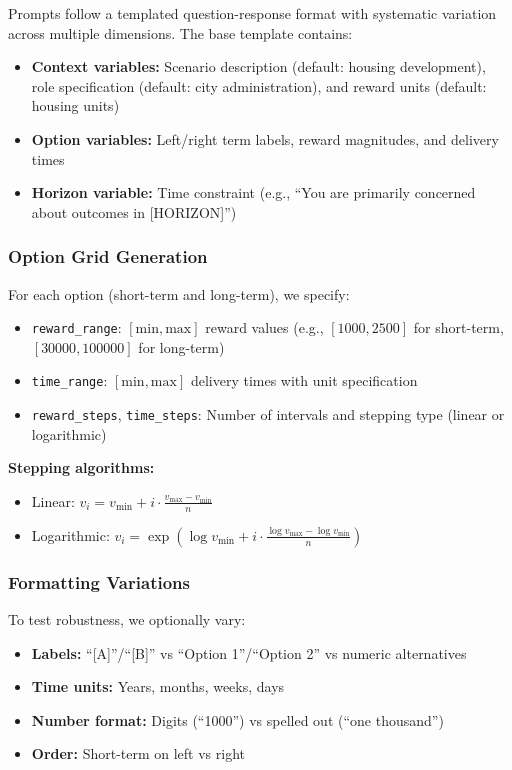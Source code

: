 \documentclass{article}
\begin{document}
Prompts follow a templated question-response format with systematic variation across multiple dimensions. The base template contains:

\begin{itemize}
    \item \textbf{Context variables:} Scenario description (default: housing development), role specification (default: city administration), and reward units (default: housing units)
    \item \textbf{Option variables:} Left/right term labels, reward magnitudes, and delivery times
    \item \textbf{Horizon variable:} Time constraint (e.g., ``You are primarily concerned about outcomes in [HORIZON]'')
\end{itemize}

\subsubsection{Option Grid Generation}

For each option (short-term and long-term), we specify:
\begin{itemize}
    \item \texttt{reward\_range}: $[\text{min}, \text{max}]$ reward values (e.g., $[1000, 2500]$ for short-term, $[30000, 100000]$ for long-term)
    \item \texttt{time\_range}: $[\text{min}, \text{max}]$ delivery times with unit specification
    \item \texttt{reward\_steps}, \texttt{time\_steps}: Number of intervals and stepping type (linear or logarithmic)
\end{itemize}

\textbf{Stepping algorithms:}
\begin{itemize}
    \item Linear: $v_i = v_{\min} + i \cdot \frac{v_{\max} - v_{\min}}{n}$
    \item Logarithmic: $v_i = \exp\left(\log v_{\min} + i \cdot \frac{\log v_{\max} - \log v_{\min}}{n}\right)$
\end{itemize}

\subsubsection{Formatting Variations}

To test robustness, we optionally vary:
\begin{itemize}
    \item \textbf{Labels:} ``[A]''/``[B]'' vs ``Option 1''/``Option 2'' vs numeric alternatives
    \item \textbf{Time units:} Years, months, weeks, days
    \item \textbf{Number format:} Digits (``1000'') vs spelled out (``one thousand'')
    \item \textbf{Order:} Short-term on left vs right
\end{itemize}
\end{document}
